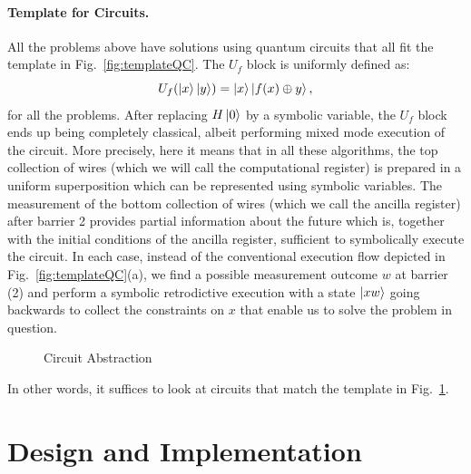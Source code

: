 \documentclass[sigplan,screen]{acmart}
\theoremstyle{definition}
\begin{document}
\paragraph*{Template for Circuits.}
All the problems above have solutions using quantum circuits that all
fit the template in Fig.~\ref{fig:templateQC}. The $U_f$ block is
uniformly defined as:
\begin{equation}
  U_f(\ket{x}\ket{y}) = \ket{x}\ket{f(x) \oplus y},
\end{equation}
for all the problems. After replacing $H\ket{0}$ by a symbolic
variable, the $U_f$ block ends up being completely classical, albeit
performing mixed mode execution of the circuit. More precisely, here
it means that in all these algorithms, the top collection of wires
(which we will call the computational register) is prepared in a
uniform superposition which can be represented using symbolic
variables. The measurement of the bottom collection of wires (which we
call the ancilla register) after barrier 2 provides partial
information about the future which is, together with the initial
conditions of the ancilla register, sufficient to symbolically execute
the circuit. In each case, instead of the conventional execution flow
depicted in Fig.~\ref{fig:templateQC}(a), we find a possible
measurement outcome $w$ at barrier (2) and perform a symbolic
retrodictive execution with a state $\ket{xw}$ going backwards to
collect the constraints on $x$ that enable us to solve the problem in
question.

\begin{figure}[t]
\caption{\label{fig:CircuitAbstraction}Circuit Abstraction}
\end{figure}

In other words, it suffices to look at circuits that match the
template in Fig.~\ref{fig:CircuitAbstraction}.

\section{Design and Implementation}
\label{sec4}
\end{document}
